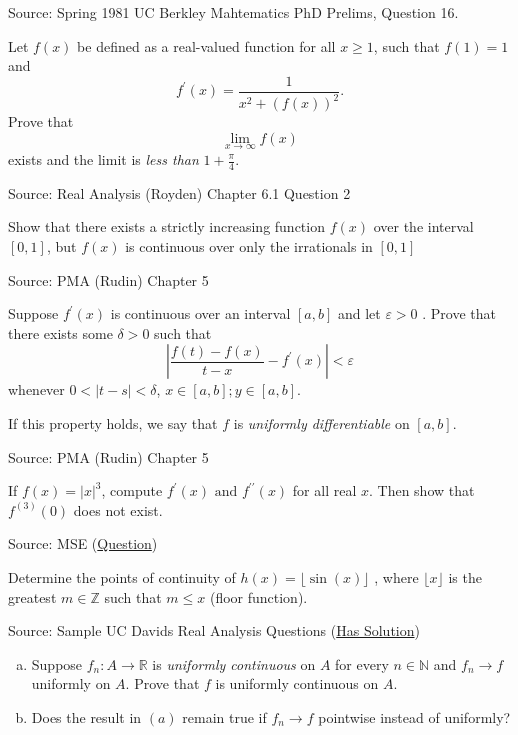 \documentclass[letterpaper,twoside]{article}
\newcounter{ex}
\begin{document}
\begin{que}
		Source: Spring 1981 UC Berkley Mahtematics PhD Prelims, Question 16.

Let $f(x)$ be defined as a real-valued function for all $x\ge 1$, such that $f(1)=1$ and \[f^\prime(x) = \frac{1}{x^2 + (f(x))^2}.\]
Prove that \[\lim_{x\to\infty}f(x)\] exists and the limit is \emph{less than} $1+\frac{\pi}{4}$. 
\end{que}	
\begin{que}
Source: Real Analysis (Royden) Chapter 6.1 Question 2

Show that there exists a strictly increasing function $f(x)$ over the interval $[0,1]$, but $f(x)$ is continuous over only the irrationals in $[0,1]$ 
\end{que}	
\begin{que}
Source: PMA (Rudin) Chapter 5

Suppose $f^\prime(x)$ is continuous over an interval $[a,b]$ and let $\varepsilon>0$ . Prove that there exists some $\delta>0$ such that 
\[\left|\frac{f(t)-f(x)}{t-x}- f^\prime(x)\right|<\varepsilon\]
whenever $0<\left|t-s\right|<\delta$, $x\in [a,b]; y\in [a,b]$.

If this property holds, we say that $f$ is \emph{uniformly differentiable} on $[a,b]$.
\end{que}	
\begin{que}
Source: PMA (Rudin) Chapter 5

If $f(x) = \left|x\right|^3$, compute $f^\prime(x) \text{ and } f^{\prime\prime}(x)$  for all real $x$. Then show that $f^{(3)}(0)$ does not exist. 
\end{que}	
\begin{que}
		Source: MSE (\href{https://math.stackexchange.com/questions/4797989/determine-the-points-of-continuity-of-hx-lfloor-sinx-rfloor}{Question})

Determine the points of continuity of $h(x)=\lfloor \sin(x)\rfloor$ , where $\lfloor x \rfloor$  is the greatest $m\in\mathbb{Z}$ such that $m\le x$  (floor function).
\end{que}	
\begin{que}
		Source: Sample UC Davids Real Analysis Questions (\href{https://www.math.ucdavis.edu/~hunter/m125a/m125a_sample_final_solutions.pdf}{Has Solution})

		\begin{enumerate}[(a)]
				\item Suppose $f_n\colon A \to \mathbb{R}$ is \emph{uniformly continuous} on $A$ for every $n\in\mathbb{N}$ and $f_n\to f$ uniformly on $A$.
						Prove that $f$ is uniformly continuous on $A$. 
				\item Does the result in $(a)$ remain true if $f_n\to f$ pointwise instead of uniformly?
		\end{enumerate}	
\end{que}	
\end{document}
